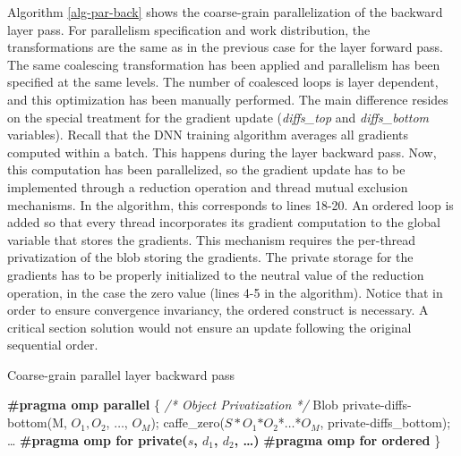 Algorithm \ref{alg-par-back} shows the coarse-grain parallelization of 
the backward layer pass. For parallelism specification and work 
distribution, the transformations are the same as in the previous 
case for the layer forward pass. The same coalescing transformation has 
been applied and parallelism has been specified at the same levels. 
The number of coalesced loops is layer dependent, and this optimization 
has been manually performed. The main difference resides on the special 
treatment for the gradient update (\emph{diffs\_top} and \emph{diffs\_bottom} 
variables). Recall that the DNN training algorithm averages all gradients 
computed within a batch. This happens during the layer backward pass.
Now, this computation has been parallelized, so the gradient update has 
to be implemented through a reduction operation and thread mutual exclusion 
mechanisms. In the algorithm, this corresponds to lines 18-20. An ordered loop 
is added so that every thread incorporates its gradient computation to 
the global variable that stores the gradients.
This mechanism requires the per-thread privatization of the blob storing 
the gradients. The private storage for the gradients has to be properly 
initialized to the neutral value of the reduction operation, in the case 
the zero value (lines 4-5 in the algorithm). Notice that in order to 
ensure convergence invariancy, the ordered construct is necessary. 
A critical section solution would not ensure an update following the 
original sequential order.

\begin{algorithm}
\small
\caption{Coarse-grain parallel layer backward pass}
\label{alg-par-back}
\BlankLine
\textbf{\#pragma omp parallel}
\BlankLine
\{
\BlankLine
\emph{/* Object Privatization */}
\BlankLine
Blob private-diffs-bottom(M, $O_1, O_2$, $\dots$, $O_M$);
\BlankLine
caffe\_zero($S*O_1$$*O_2$*$\dots$*$O_M$, private-diffs\_bottom);
\BlankLine
\dots
\BlankLine
\textbf{\#pragma omp for private($s$, $d_1$, $d_2$, \dots)}
\BlankLine
{}
\textbf{\#pragma omp for ordered}
\BlankLine
{}
\}
\end{algorithm}
